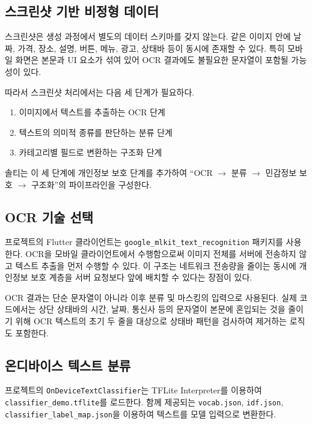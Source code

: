 \documentclass[11pt,a4paper]{article}
\begin{document}
\subsection{스크린샷 기반 비정형 데이터}

스크린샷은 생성 과정에서 별도의 데이터 스키마를 갖지 않는다. 같은 이미지 안에 날짜, 가격, 장소, 설명, 버튼, 메뉴, 광고, 상태바 등이 동시에 존재할 수 있다. 특히 모바일 화면은 본문과 UI 요소가 섞여 있어 OCR 결과에도 불필요한 문자열이 포함될 가능성이 있다.

따라서 스크린샷 처리에서는 다음 세 단계가 필요하다.

\begin{enumerate}
    \item 이미지에서 텍스트를 추출하는 OCR 단계
    \item 텍스트의 의미적 종류를 판단하는 분류 단계
    \item 카테고리별 필드로 변환하는 구조화 단계
\end{enumerate}

솔티는 이 세 단계에 개인정보 보호 단계를 추가하여 ``OCR $\rightarrow$ 분류 $\rightarrow$ 민감정보 보호 $\rightarrow$ 구조화''의 파이프라인을 구성한다.

\subsection{OCR 기술 선택}

프로젝트의 Flutter 클라이언트는 \texttt{google\_mlkit\_text\_recognition} 패키지를 사용한다. OCR을 모바일 클라이언트에서 수행함으로써 이미지 전체를 서버에 전송하지 않고 텍스트 추출을 먼저 수행할 수 있다. 이 구조는 네트워크 전송량을 줄이는 동시에 개인정보 보호 계층을 서버 요청보다 앞에 배치할 수 있다는 장점이 있다.

OCR 결과는 단순 문자열이 아니라 이후 분류 및 마스킹의 입력으로 사용된다. 실제 코드에서는 상단 상태바의 시간, 날짜, 통신사 등의 문자열이 본문에 혼입되는 것을 줄이기 위해 OCR 텍스트의 초기 두 줄을 대상으로 상태바 패턴을 검사하여 제거하는 로직도 포함한다.

\subsection{온디바이스 텍스트 분류}

프로젝트의 \texttt{OnDeviceTextClassifier}는 TFLite Interpreter를 이용하여 \texttt{classifier\_demo.tflite}를 로드한다. 함께 제공되는 \texttt{vocab.json}, \texttt{idf.json}, \texttt{classifier\_label\_map.json}을 이용하여 텍스트를 모델 입력으로 변환한다.
\end{document}
